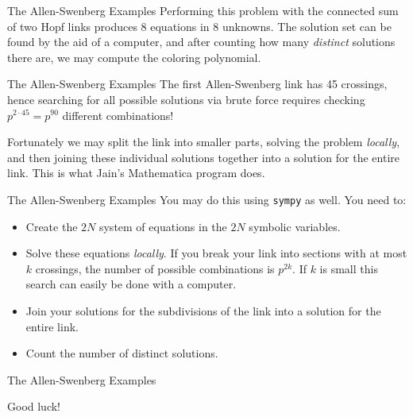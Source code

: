 \documentclass{beamer}
\begin{document}
    \begin{frame}{The Allen-Swenberg Examples}
        Performing this problem with the connected sum of two Hopf links
        produces $8$ equations in $8$ unknowns. The solution set can be found
        by the aid of a computer, and after counting how many \textit{distinct}
        solutions there are, we may compute the coloring polynomial.
    \end{frame}
    \begin{frame}{The Allen-Swenberg Examples}
        The first Allen-Swenberg link has 45 crossings, hence searching for
        all possible solutions via brute force requires checking
        $p^{2\cdot{45}}=p^{90}$ different combinations!
        \par\hfill\par
        Fortunately we may split the link into smaller parts, solving the
        problem \textit{locally}, and then joining these individual solutions
        together into a solution for the entire link. This is what Jain's
        Mathematica program does.
    \end{frame}
    \begin{frame}{The Allen-Swenberg Examples}
        You may do this using \texttt{sympy} as well. You need to:
        \begin{itemize}
            \item
                Create the $2N$ system of equations in the $2N$
                symbolic variables.
            \item
                Solve these equations \textit{locally}. If you break your
                link into sections with at most $k$ crossings, the number of
                possible combinations is $p^{2k}$. If $k$ is small this search
                can easily be done with a computer.
            \item
                Join your solutions for the subdivisions of the link into a
                solution for the entire link.
                \item
                Count the number of distinct solutions.
        \end{itemize}
    \end{frame}
    \begin{frame}{The Allen-Swenberg Examples}
        \begin{center}
            Good luck!
        \end{center}
    \end{frame}
\end{document}
